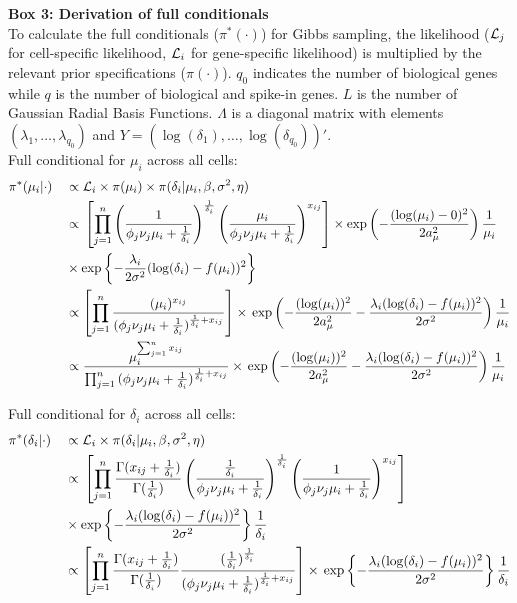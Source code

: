 \begin{Comment}
\textbf{Box 3: Derivation of full conditionals}\\
To calculate the full conditionals ($\pi^*(\cdot)$) for Gibbs sampling, the likelihood ($\mathcal{L}_j$ for cell-specific likelihood, $\mathcal{L}_i$ for gene-specific likelihood) is multiplied by the relevant prior specifications ($\pi(\cdot)$). $q_0$ indicates the number of biological genes while $q$ is the number of biological and spike-in genes. $L$ is the number of Gaussian Radial Basis Functions. $\Lambda$ is a diagonal matrix with elements $(\lambda_1, \ldots, \lambda_{q_0})$ and $Y = (\log(\delta_1), \ldots, \log(\delta_{q_0}))'$.\\ 

Full conditional for $\mu_i$ across all cells:
\begin{align*}
&\pi^*(\mu_i|\cdot)&&\propto{} \mathcal{L}_i\times\pi(\mu_i)\times\pi(\delta_i|\mu_i,\beta,\sigma^2,\eta)\\
& &&\propto{}\left[\prod_{j=1}^n\left(\frac{1}{\phi_j\nu_j\mu_i+\frac{1}{\delta_i}}\right)^\frac{1}{\delta_i}\left(\frac{\mu_i}{\phi_j\nu_j\mu_i+\frac{1}{\delta_i}}\right)^{x_{ij}}\right]\times\exp\left(-\frac{(\log(\mu_i)-0)^2}{2a_\mu^2}\right)\frac{1}{\mu_i}\\
& &&\times\exp\left\lbrace-\frac{\lambda_i}{2\sigma^2}(\log(\delta_i)-f(\mu_i))^2\right\rbrace\\
& &&\propto\left[\prod_{j=1}^n{}\frac{(\mu_i)^{x_{ij}}}{(\phi_j\nu_j\mu_i+\frac{1}{\delta_i})^{\frac{1}{\delta_i}+x_{ij}}}\right]\times{}\exp\left(-\frac{(\log(\mu_i))^2}{2a_\mu^2}-\frac{\lambda_i(\log(\delta_i)-f(\mu_i))^2}{2\sigma^2}\right)\frac{1}{\mu_i}\\
& &&\propto{}\frac{\mu_i^{\sum_{j=1}^n{}x_{ij}}}{\prod_{j=1}^n{}(\phi_j\nu_j\mu_i+\frac{1}{\delta_i})^{\frac{1}{\delta_i}+x_{ij}}}\times{}\exp\left(-\frac{(\log(\mu_i))^2}{2a_\mu^2}-\frac{\lambda_i(\log(\delta_i)-f(\mu_i))^2}{2\sigma^2}\right)\frac{1}{\mu_i}
\end{align*}

Full conditional for $\delta_i$ across all cells:
\begin{align*}
&\pi^*(\delta_i|\cdot)&&\propto{} \mathcal{L}_i\times\pi(\delta_i|\mu_i,\beta,\sigma^2,\eta)\\
& &&\propto{}\left[\prod_{j=1}^n\frac{\Gamma(x_{ij}+\frac{1}{\delta_i})}{\Gamma(\frac{1}{\delta_i})}\left(\frac{\frac{1}{\delta_i}}{\phi_j\nu_j\mu_i+\frac{1}{\delta_i}}\right)^\frac{1}{\delta_i}\left(\frac{1}{\phi_j\nu_j\mu_i+\frac{1}{\delta_i}}\right)^{x_{ij}}\right]\\
& &&\times\exp\left\lbrace-\frac{\lambda_i(\log(\delta_i)-f(\mu_i))^2}{2\sigma^2}\right\rbrace\frac{1}{\delta_i}\\
& &&\propto\left[\prod_{j=1}^n\frac{\Gamma(x_{ij}+\frac{1}{\delta_i})}{\Gamma(\frac{1}{\delta_i})}\frac{(\frac{1}{\delta_i})^{\frac{1}{\delta_i}}}{(\phi_j\nu_j\mu_i+\frac{1}{\delta_i})^{\frac{1}{\delta_i}+x_{ij}}}\right]\times{}\exp\left\lbrace-\frac{\lambda_i(\log(\delta_i)-f(\mu_i))^2}{2\sigma^2}\right\rbrace\frac{1}{\delta_i}\\
\end{align*}

\end{Comment}

